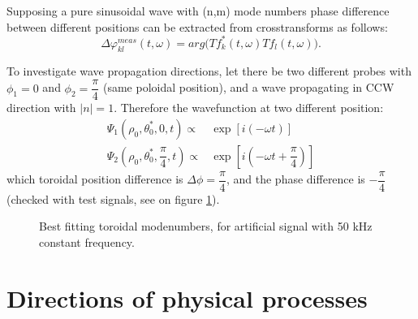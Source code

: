 \documentclass[12pt,a4paper]{article}
\begin{document}
Supposing a pure sinusoidal wave with (n,m) mode numbers phase difference between different positions can be extracted from crosstransforms as follows:
\begin{equation}
\Delta\varphi_{kl}^{meas}(t,\omega) = arg\big( T f_k^*(t,\omega)T f_l(t,\omega)  \big).
\end{equation}

To investigate wave propagation directions, let there be two different probes with $\phi_1 = 0$ and $\phi_2=\dfrac{\pi}{4}$ (same poloidal position), and a wave propagating in CCW direction with $|n|=1$. Therefore the wavefunction at two different position:
\begin{eqnarray}
\Psi_1(\rho_0,\theta_0^*,0,t) \propto & \exp[i(-\omega t)] \\
\Psi_2(\rho_0,\theta_0^*,\dfrac{\pi}{4},t) \propto & \exp[i(-\omega t+\dfrac{\pi}{4})]
\end{eqnarray}
which toroidal position difference is $\Delta\phi = \dfrac{\pi}{4}$, and the phase difference is $-\dfrac{\pi}{4}$ (checked with test signals, see on figure \ref{fig:toroidal_modenumber}).
\begin{figure}[htb!]
  \centerline{}
  \caption{\label{fig:toroidal_modenumber}Best fitting toroidal modenumbers, for artificial signal with 50 kHz constant frequency.}
\end{figure}

\section{Directions of physical processes}
\end{document}
